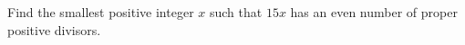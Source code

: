 Find the smallest positive integer $x$ such that $15x$ has an even number of proper positive divisors.
